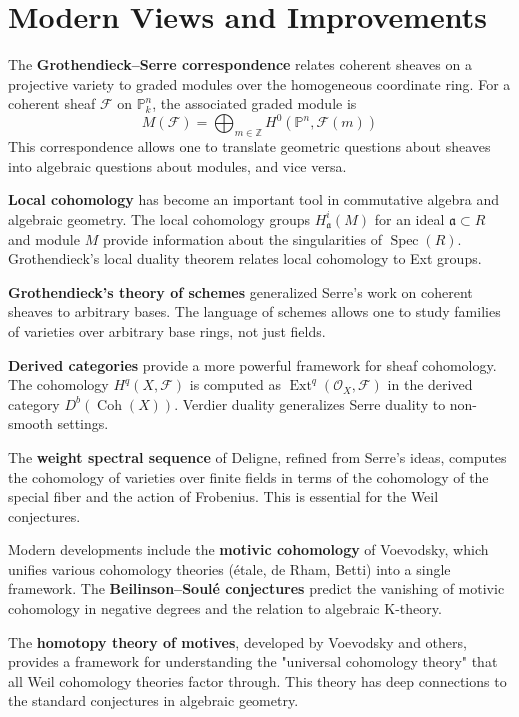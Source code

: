 \section{Modern Views and Improvements}

The \textbf{Grothendieck--Serre correspondence} relates coherent sheaves on a projective variety to graded modules over the homogeneous coordinate ring. For a coherent sheaf $\mathcal{F}$ on $\mathbb{P}^n_k$, the associated graded module is
\[M(\mathcal{F}) = \bigoplus_{m \in \mathbb{Z}} H^0(\mathbb{P}^n, \mathcal{F}(m))\]
This correspondence allows one to translate geometric questions about sheaves into algebraic questions about modules, and vice versa.

\textbf{Local cohomology} has become an important tool in commutative algebra and algebraic geometry. The local cohomology groups $H^i_{\mathfrak{a}}(M)$ for an ideal $\mathfrak{a} \subset R$ and module $M$ provide information about the singularities of $\operatorname{Spec}(R)$. Grothendieck's local duality theorem relates local cohomology to Ext groups.

\textbf{Grothendieck's theory of schemes} generalized Serre's work on coherent sheaves to arbitrary bases. The language of schemes allows one to study families of varieties over arbitrary base rings, not just fields.

\textbf{Derived categories} provide a more powerful framework for sheaf cohomology. The cohomology $H^q(X, \mathcal{F})$ is computed as $\operatorname{Ext}^q(\mathcal{O}_X, \mathcal{F})$ in the derived category $D^b(\operatorname{Coh}(X))$. Verdier duality generalizes Serre duality to non-smooth settings.

The \textbf{weight spectral sequence} of Deligne, refined from Serre's ideas, computes the cohomology of varieties over finite fields in terms of the cohomology of the special fiber and the action of Frobenius. This is essential for the Weil conjectures.

Modern developments include the \textbf{motivic cohomology} of Voevodsky, which unifies various cohomology theories (étale, de Rham, Betti) into a single framework. The \textbf{Beilinson--Soulé conjectures} predict the vanishing of motivic cohomology in negative degrees and the relation to algebraic K-theory.

The \textbf{homotopy theory of motives}, developed by Voevodsky and others, provides a framework for understanding the "universal cohomology theory" that all Weil cohomology theories factor through. This theory has deep connections to the standard conjectures in algebraic geometry.


